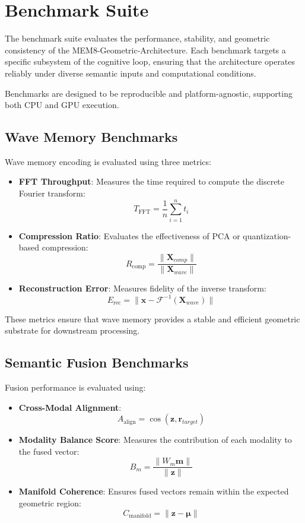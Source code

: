 \section{Benchmark Suite}

The benchmark suite evaluates the performance, stability, and geometric
consistency of the MEM8-Geometric-Architecture. Each benchmark targets a
specific subsystem of the cognitive loop, ensuring that the architecture
operates reliably under diverse semantic inputs and computational conditions.

Benchmarks are designed to be reproducible and platform-agnostic, supporting
both CPU and GPU execution.

\subsection{Wave Memory Benchmarks}

Wave memory encoding is evaluated using three metrics:

\begin{itemize}
\item \textbf{FFT Throughput}: Measures the time required to compute the
discrete Fourier transform:
\[
T_{\mathrm{FFT}} = \frac{1}{n} \sum_{i=1}^n t_i
\]

\item \textbf{Compression Ratio}: Evaluates the effectiveness of PCA or
quantization-based compression:
\[
R_{\mathrm{comp}} = \frac{\|\mathbf{X}_{comp}\|}{\|\mathbf{X}_{wave}\|}
\]

\item \textbf{Reconstruction Error}: Measures fidelity of the inverse transform:
\[
E_{\mathrm{rec}} = \|\mathbf{x} - \mathcal{F}^{-1}(\mathbf{X}_{wave})\|
\]
\end{itemize}

These metrics ensure that wave memory provides a stable and efficient geometric
substrate for downstream processing.

\subsection{Semantic Fusion Benchmarks}

Fusion performance is evaluated using:

\begin{itemize}
\item \textbf{Cross-Modal Alignment}:
\[
A_{\mathrm{align}} =
\cos(\mathbf{z}, \mathbf{r}_{target})
\]

\item \textbf{Modality Balance Score}: Measures the contribution of each
modality to the fused vector:
\[
B_m = \frac{\|W_m \mathbf{m}\|}{\|\mathbf{z}\|}
\]

\item \textbf{Manifold Coherence}: Ensures fused vectors remain within the
expected geometric region:
\[
C_{\mathrm{manifold}} =
\|\mathbf{z} - \bm{\mu}\|
\]
\end{itemize}

